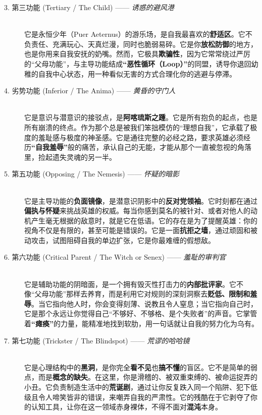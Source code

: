 \documentclass[UTF8,letter,10pt]{ctexart}
\begin{document}
\begin{table}[h!]
\begin{description}
    \item[3. 第三功能 (Tertiary / The Child) —— \textit{诱惑的避风港}] \hfill \\
    它是永恒少年（Puer Aeternus）的游乐场，是自我最喜欢的\textbf{舒适区}。它不负责任、充满玩心、天真烂漫，同时也脆弱易碎。它是你\textbf{放松防御}的地方，也是你用来自我安抚的奶嘴。然而，它极具\textbf{欺骗性}，因为它常常绕过严厉的``父母功能''，与主导功能结成\textbf{``恶性循环（Loop）''}的同盟，诱导你退回幼稚的自我中心状态，用一种看似无害的方式合理化你的逃避与停滞。

    \item[4. 劣势功能 (Inferior / The Anima) —— \textit{黄昏的守门人}] \hfill \\
    它是意识与潜意识的接驳点，是\textbf{阿喀琉斯之踵}。它是所有抱负的起点，也是所有崩溃的终点。作为那个总是被我们笨拙模仿的``理想自我''，它承载了极度的羞耻感与极度的神圣感。它是通往完整的必经之路，要求英雄必须经历\textbf{``自我羞辱''}般的痛苦，承认自己的无能，才能从那个一直被忽视的角落里，捡起遗失灵魂的另一半。

    \item[5. 第五功能 (Opposing / The Nemesis) —— \textit{怀疑的暗影}] \hfill \\
    它是主导功能的\textbf{负面镜像}，是潜意识阴影中的\textbf{反对党领袖}。它时刻都在通过\textbf{偏执与怀疑}来挑战英雄的权威。每当你感到莫名的被针对、或者对他人的动机产生毫无根据的敌意时，就是它在低语。它的存在是为了提醒英雄：你的视角不仅是有限的，甚至可能是错误的。它是一面\textbf{抗拒之墙}，通过顽固和被动攻击，试图阻碍自我的单边扩张，它是你最难缠的假想敌。

    \item[6. 第六功能 (Critical Parent / The Witch or Senex) —— \textit{羞耻的审判官}] \hfill \\
    它是辅助功能的阴暗面，是一个拥有毁灭性打击力的\textbf{内部批评家}。它不像``父母功能''那样去养育，而是利用它对规则的深刻洞察去\textbf{贬低、限制和羞辱}。当它指向他人时，你会变得刻薄、说教且令人窒息；当它指向自己时，它是那个永远让你觉得自己``不够好、不够格、是个失败者''的声音。它掌管着\textbf{``瘫痪''}的力量，能精准地找到软肋，用一句话就让自我的努力化为乌有。

    \item[7. 第七功能 (Trickster / The Blindspot) —— \textit{荒谬的哈哈镜}] \hfill \\
    它是心理结构中的\textbf{黑洞}，是你完全\textbf{看不见}也\textbf{搞不懂}的盲区。它不是简单的弱点，而是\textbf{概念的缺失}。在这里，你是滑稽的、被双重束缚的、被命运捉弄的小丑。它负责制造生活中的\textbf{荒诞剧}，通过让你反复跌入同一个陷阱、犯下低级且令人啼笑皆非的错误，来嘲弄自我的严肃性。它的残酷在于它剥夺了你的认知工具，让你在这一领域赤身裸体，不得不面对\textbf{混沌}本身。


\end{description}
\end{table}
\end{document}
